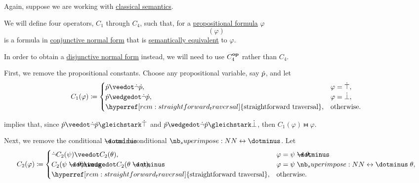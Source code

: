 \begin{algorithm}\label{alg:cnf_and_dnf}
  Again, suppose we are working with \hyperref[def:propositional_semantics/classical]{classical semantics}.

  We will define four operators, \( C_1 \) through \( C_4 \), such that, for a \hyperref[def:propositional_syntax/formula]{propositional formula} \( \varphi \)
  \begin{equation*}
    [C_4 \bincirc C_3 \bincirc C_2 \bincirc C_1](\varphi)
  \end{equation*}
  is a formula in \hyperref[def:cnf_and_dnf]{conjunctive normal form} that is \hyperref[def:semantic_equivalence]{semantically equivalent} to \( \varphi \).

  In order to obtain a \hyperref[def:cnf_and_dnf]{disjunctive normal form} instead, we will need to use \( C_4^\oppos \) rather than \( C_4 \).

  \begin{thmenum}
     First, we remove the propositional constants. Choose any propositional variable, say \( {\dot{p}} \), and let
    \begin{equation*}
      C_1(\varphi) \coloneqq \begin{cases}
        \synp \synvee \synneg \synp,                                           &\varphi = \syntop, \\
        \synp \synwedge \synneg \synp,                                         &\varphi = \synbot, \\
        \hyperref[rem:straightforward_traversal]{\T{straightforward traversal}}, &\T{otherwise.}
      \end{cases}
    \end{equation*}

     implies that, since \( \synp \synvee \synneg \synp \gleichstark \syntop \) and \( \synp \synwedge \synneg \synp \gleichstark \synbot \), then \( C_1(\varphi) \gleichstark \varphi \).

     Next, we remove the conditional \( \synimplies \) and biconditional \( \syniff \). Let
    \begin{equation*}
      C_2(\varphi) \coloneqq \begin{cases}
        \synneg C_2(\psi) \synvee C_2(\theta),                                   &\varphi = \psi \synimplies \theta, \\
        C_2(\psi \synimplies \theta) \synwedge C_2(\theta \synimplies \psi),     &\varphi = \psi \syniff \theta, \\
        \hyperref[rem:straightforward_traversal]{\T{straightforward traversal}}, &\T{otherwise.}
      \end{cases}
    \end{equation*}


\end{thmenum}
\end{algorithm}
